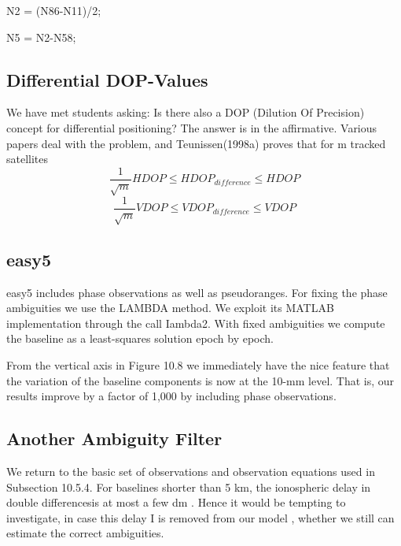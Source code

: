 N2 = (N86-N11)/2;

N5 = N2-N58;

\subsection{Differential DOP-Values}

We have met students asking: Is there also a DOP (Dilution Of Precision) concept for
differential positioning? The answer is in the affirmative. Various papers deal with the
problem, and Teunissen(1998a) proves that for m tracked satellites
$$
\frac{1}{\sqrt{m}}HDOP\leq HDOP_{difference}\leq HDOP
$$
$$
\frac{1}{\sqrt{m}}VDOP\leq VDOP_{difference}\leq VDOP
$$

\subsection{easy5}

easy5 includes phase observations as well as pseudoranges. For fixing the phase ambiguities we use the LAMBDA method. We exploit its MATLAB implementation through the call Iambda2. With fixed ambiguities we compute the baseline as a least-squares solution epoch by epoch.

From the vertical axis in Figure 10.8 we immediately have the nice feature that the variation of the baseline components is now at the 10-mm level. That is, our results improve by a factor of 1,000 by including phase observations.

\subsection{Another Ambiguity Filter}

We return to the basic set of observations and observation equations used in Subsection 10.5.4. For baselines shorter than 5 km, the ionospheric delay in double differencesis at most a few dm . Hence it would be tempting to investigate, in case this delay I is removed from our model , whether we still can estimate the correct ambiguities.

